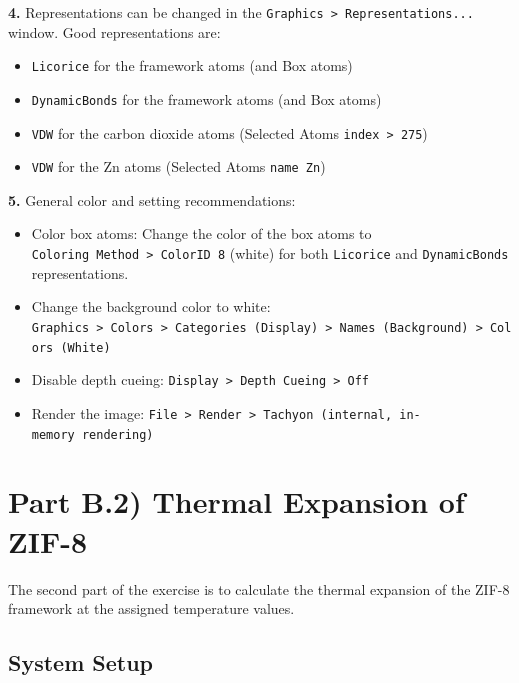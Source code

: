 \documentclass[
  letterpaper,
]{article}
\providecommand{\tightlist}{%
  \setlength{\itemsep}{0pt}\setlength{\parskip}{0pt}}\usepackage{longtable,booktabs,array}
\begin{document}
\textbf{4.} Representations can be changed in the
\texttt{Graphics\ \textgreater{}\ Representations...} window. Good
representations are:

\begin{itemize}
\tightlist
\item
  \texttt{Licorice} for the framework atoms (and Box atoms)
\item
  \texttt{DynamicBonds} for the framework atoms (and Box atoms)
\item
  \texttt{VDW} for the carbon dioxide atoms (Selected Atoms
  \texttt{index\ \textgreater{}\ 275})
\item
  \texttt{VDW} for the Zn atoms (Selected Atoms \texttt{name\ Zn})
\end{itemize}

\textbf{5.} General color and setting recommendations:

\begin{itemize}
\tightlist
\item
  Color box atoms: Change the color of the box atoms to
  \texttt{Coloring\ Method\ \textgreater{}\ ColorID\ 8} (white) for both
  \texttt{Licorice} and \texttt{DynamicBonds} representations.
\item
  Change the background color to white:
  \texttt{Graphics\ \textgreater{}\ Colors\ \textgreater{}\ Categories\ (Display)\ \textgreater{}\ Names\ (Background)\ \textgreater{}\ Colors\ (White)}
\item
  Disable depth cueing:
  \texttt{Display\ \textgreater{}\ Depth\ Cueing\ \textgreater{}\ Off}
\item
  Render the image:
  \texttt{File\ \textgreater{}\ Render\ \textgreater{}\ Tachyon\ (internal,\ in-memory\ rendering)}
\end{itemize}

\hypertarget{part-b.2-thermal-expansion-of-zif-8}{%
\section{Part B.2) Thermal Expansion of
ZIF-8}\label{part-b.2-thermal-expansion-of-zif-8}}

The second part of the exercise is to calculate the thermal expansion of
the ZIF-8 framework at the assigned temperature values.

\hypertarget{system-setup-1}{%
\subsection*{System Setup}\label{system-setup-1}}
\end{document}
